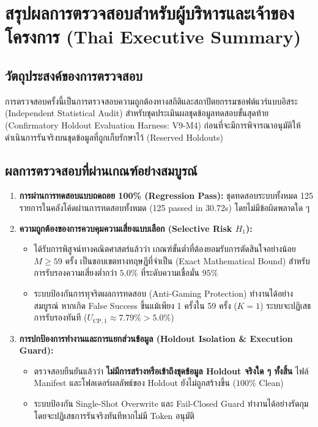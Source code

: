 \documentclass[10pt,a4paper]{article}
\begin{document}
\section{สรุปผลการตรวจสอบสำหรับผู้บริหารและเจ้าของโครงการ (Thai Executive Summary)}
{\thaifont
\subsection{วัตถุประสงค์ของการตรวจสอบ}
การตรวจสอบครั้งนี้เป็นการตรวจสอบความถูกต้องทางสถิติและสถาปัตยกรรมซอฟต์แวร์แบบอิสระ (Independent Statistical Audit) สำหรับชุดประเมินผลชุดข้อมูลทดสอบขั้นสุดท้าย (Confirmatory Holdout Evaluation Harness: V9-M4) ก่อนที่จะมีการพิจารณาอนุมัติให้ดำเนินการรันจริงบนชุดข้อมูลที่ถูกเก็บรักษาไว้ (Reserved Holdouts)

\subsection{ผลการตรวจสอบที่ผ่านเกณฑ์อย่างสมบูรณ์}
\begin{enumerate}
    \item \textbf{การผ่านการทดสอบแบบถดถอย 100\% (Regression Pass):} ชุดทดสอบระบบทั้งหมด 125 รายการในคลังโค้ดผ่านการทดสอบทั้งหมด (125 passed in 30.72s) โดยไม่มีข้อผิดพลาดใด ๆ
    \item \textbf{ความถูกต้องของการควบคุมความเสี่ยงแบบเลือก (Selective Risk $H_1$):}
    \begin{itemize}
        \item ได้รับการพิสูจน์ทางคณิตศาสตร์แล้วว่า เกณฑ์ขั้นต่ำที่ต้องยอมรับการตัดสินใจอย่างน้อย $M \ge 59$ ครั้ง เป็นขอบเขตทางทฤษฎีที่จำเป็น (Exact Mathematical Bound) สำหรับการรับรองความเสี่ยงต่ำกว่า $5.0\%$ ที่ระดับความเชื่อมั่น $95\%$
        \item ระบบป้องกันการทุจริตผลการทดสอบ (Anti-Gaming Protection) ทำงานได้อย่างสมบูรณ์ หากเกิด False Success ขึ้นแม้เพียง 1 ครั้งใน 59 ครั้ง ($K=1$) ระบบจะปฏิเสธการรับรองทันที ($U_{\mathrm{CP}, 1} \approx 7.79\% > 5.0\%$)
    \end{itemize}
    \item \textbf{การปกป้องการทำงานและการแยกส่วนข้อมูล (Holdout Isolation \& Execution Guard):}
    \begin{itemize}
        \item ตรวจสอบยืนยันแล้วว่า \textbf{ไม่มีการสร้างหรือเข้าถึงชุดข้อมูล Holdout จริงใด ๆ ทั้งสิ้น} ไฟล์ Manifest และโฟลเดอร์ผลลัพธ์ของ Holdout ยังไม่ถูกสร้างขึ้น ($100\%$ Clean)
        \item ระบบป้องกัน Single-Shot Overwrite และ Fail-Closed Guard ทำงานได้อย่างรัดกุม โดยจะปฏิเสธการรันจริงทันทีหากไม่มี Token อนุมัติ
    \end{itemize}
\end{enumerate}

}
\end{document}
